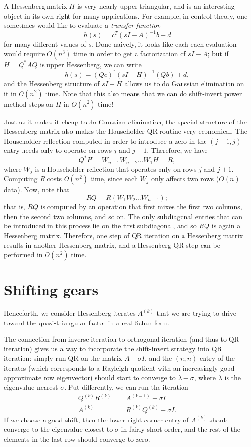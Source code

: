 \documentclass[12pt, leqno]{article} %
\begin{document}
A Hessenberg matrix $H$ is very nearly upper triangular, and is an
interesting object in its own right for many applications.  For
example, in control theory, one sometimes would like to evaluate a
{\em transfer function}
\[
  h(s) = c^T (sI-A)^{-1} b + d
\]
for many different values of $s$.  Done naively, it looks like each
each evaluation would require $O(n^3)$ time in order to get a
factorization of $sI-A$; but if $H = Q^* A Q$ is upper Hessenberg, we
can write
\[
  h(s) = (Qc)^* (sI-H)^{-1} (Qb) + d,
\]
and the Hessenberg structure of $sI-H$ allows us to do Gaussian
elimination on it in $O(n^2)$ time.  Note that this also means that we
can do shift-invert power method steps on $H$ in $O(n^2)$ time!

Just as it makes it cheap to do Gaussian elimination, the special
structure of the Hessenberg matrix also makes the Householder QR
routine very economical.  The Householder reflection computed in order
to introduce a zero in the $(j+1,j)$ entry needs only to operate on
rows $j$ and $j+1$.  Therefore, we have
\[
  Q^* H = W_{n-1} W_{n-2} \ldots W_1 H = R,
\]
where $W_{j}$ is a Householder reflection that operates only on rows
$j$ and $j+1$.  Computing $R$ costs $O(n^2)$ time, since each $W_j$
only affects two rows ($O(n)$ data).  Now, note that
\[
  R Q = R (W_1 W_2 \ldots W_{n-1});
\]
that is, $RQ$ is computed by an operation that first mixes the first
two columns, then the second two columns, and so on.  The only subdiagonal
entries that can be introduced in this process lie on the first subdiagonal,
and so $RQ$ is again a Hessenberg matrix.  Therefore, one step of QR iteration
on a Hessenberg matrix results in another Hessenberg matrix, and a Hessenberg
QR step can be performed in $O(n^2)$ time.

\section{Shifting gears}

Henceforth, we consider Hessenberg iterates $A^{(k)}$ that we are
trying to drive toward the quasi-triangular factor in a real Schur form.

The connection from inverse iteration to orthogonal iteration (and
thus to QR iteration) gives us a way to incorporate the shift-invert
strategy into QR iteration: simply run QR on the matrix $A-\sigma I$,
and the $(n,n)$ entry of the iterates (which corresponds to a Rayleigh
quotient with an increasingly-good approximate row eigenvector) should
start to converge to $\lambda - \sigma$, where $\lambda$ is the
eigenvalue nearest $\sigma$.  Put differently, we can run the iteration
\begin{align*}
  Q^{(k)} R^{(k)} &= A^{(k-1)} - \sigma I \\
  A^{(k)} &= R^{(k)} Q^{(k)} + \sigma I.
\end{align*}
If we choose a good shift, then the lower right corner entry of
$A^{(k)}$ should converge to the eigenvalue closest to $\sigma$ in
fairly short order, and the rest of the elements in the last row
should converge to zero.
\end{document}
